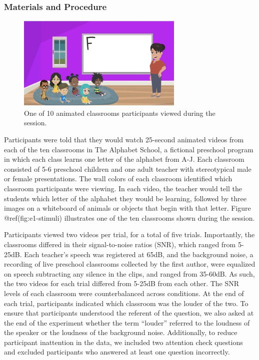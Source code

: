 \documentclass[10pt, letterpaper]{article}
\newenvironment{CodeChunk}{}{}
\begin{document}
\hypertarget{materials-and-procedure}{%
\subsubsection{Materials and Procedure}\label{materials-and-procedure}}

\begin{CodeChunk}
\begin{figure}[ht]

{\centering \includegraphics{figs/e1-stimuli-1} 

}

\caption[One of 10 animated classrooms participants viewed during the session]{One of 10 animated classrooms participants viewed during the session.}\label{fig:e1-stimuli}
\end{figure}
\end{CodeChunk}

Participants were told that they would watch 25-second animated videos
from each of the ten classrooms in The Alphabet School, a fictional
preschool program in which each class learns one letter of the alphabet
from A-J. Each classroom consisted of 5-6 preschool children and one
adult teacher with stereotypical male or female presentations. The wall
colors of each classroom identified which classroom participants were
viewing. In each video, the teacher would tell the students which letter
of the alphabet they would be learning, followed by three images on a
whiteboard of animals or objects that begin with that letter. Figure
@ref(fig:e1-stimuli) illustrates one of the ten classrooms shown during
the session.

Participants viewed two videos per trial, for a total of five trials.
Importantly, the classrooms differed in their signal-to-noise ratios
(SNR), which ranged from 5-25dB. Each teacher's speech was registered at
65dB, and the background noise, a recording of live preschool classrooms
collected by the first author, were equalized on speech subtracting any
silence in the clips, and ranged from 35-60dB. As such, the two videos
for each trial differed from 5-25dB from each other. The SNR levels of
each classroom were counterbalanced across conditions. At the end of
each trial, participants indicated which classroom was the louder of the
two. To ensure that participants understood the referent of the
question, we also asked at the end of the experiment whether the term
``louder'' referred to the loudness of the speaker or the loudness of
the background noise. Additionally, to reduce participant inattention in
the data, we included two attention check questions and excluded
participants who answered at least one question incorrectly.
\end{document}
